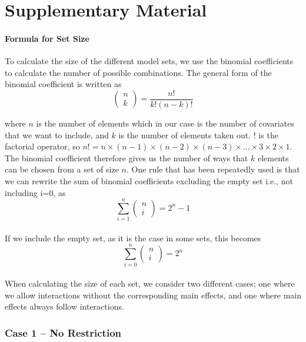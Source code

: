 \part*{Supplementary Material} 

\setcounter{table}{0}
\setcounter{figure}{0}
\renewcommand{\thetable}{S\arabic{table}}
\renewcommand{\thefigure}{S\arabic{figure}}

\subsection{Formula for Set Size}
To calculate the size of the different model sets, we use the binomial coefficients to calculate the number of possible combinations. The general form of the binomial coefficient is written as
\[\left( \begin{array}{c}
n \\ 
k \end{array}
\right)=\frac{n!}{k!\left(n-k\right)!}\] 

where $n$ is the number of elements which in our case is the number of covariates that we want to include, and $k$ is the number of elements taken out. $!$ is the factorial operator, so $n!=n\times \left(n-1\right)\times \left(n-2\right)\times \left(n-3\right)\times \dots \times 3\times 2\times 1$. The binomial coefficient therefore gives us the number of ways that $k$ elements can be chosen from a set of size $n$. One rule that has been repeatedly used is that we can rewrite the sum of binomial coefficients excluding the empty set i.e., not including i=0, as 
\[\sum^n_{i=1}{\left( \begin{array}{c}
n \\ 
i \end{array}
\right)}=2^n-1\] 
\\
If we include the empty set, as it is the case in some sets, this becomes
\[\sum^n_{i=0}{\left( \begin{array}{c}
n \\ 
i \end{array}
\right)}=2^n\] 
\\
When calculating the size of each set, we consider two different cases; one where we allow interactions without the corresponding main effects, and one where main effects always follow interactions. \\

\section{Case 1 – No Restriction}
